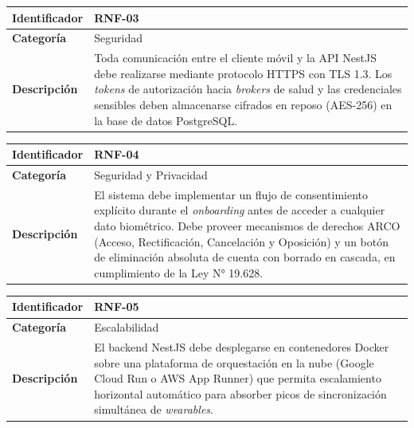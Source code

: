 \documentclass[12pt]{article}
\begin{document}
\begin{table}[h!]
    \centering
    \renewcommand{\arraystretch}{1.3}
    \begin{tabular}{|p{3.5cm}|p{11.5cm}|}
        \hline
        \rowcolor[HTML]{EFEFEF}
        \textbf{Identificador} & \textbf{RNF-03} \\ \hline
        \textbf{Categoría} & Seguridad \\ \hline
        \textbf{Descripción} & Toda comunicación entre el cliente móvil y la API NestJS debe realizarse mediante protocolo HTTPS con TLS 1.3. Los \textit{tokens} de autorización hacia \textit{brokers} de salud y las credenciales sensibles deben almacenarse cifrados en reposo (AES-256) en la base de datos PostgreSQL. \\ \hline
    \end{tabular}
\end{table}

\begin{table}[h!]
    \centering
    \renewcommand{\arraystretch}{1.3}
    \begin{tabular}{|p{3.5cm}|p{11.5cm}|}
        \hline
        \rowcolor[HTML]{EFEFEF}
        \textbf{Identificador} & \textbf{RNF-04} \\ \hline
        \textbf{Categoría} & Seguridad y Privacidad \\ \hline
        \textbf{Descripción} & El sistema debe implementar un flujo de consentimiento explícito durante el \textit{onboarding} antes de acceder a cualquier dato biométrico. Debe proveer mecanismos de derechos ARCO (Acceso, Rectificación, Cancelación y Oposición) y un botón de eliminación absoluta de cuenta con borrado en cascada, en cumplimiento de la Ley N° 19.628. \\ \hline
    \end{tabular}
\end{table}
\newpage
\begin{table}[h!]
    \centering
    \renewcommand{\arraystretch}{1.3}
    \begin{tabular}{|p{3.5cm}|p{11.5cm}|}
        \hline
        \rowcolor[HTML]{EFEFEF}
        \textbf{Identificador} & \textbf{RNF-05} \\ \hline
        \textbf{Categoría} & Escalabilidad \\ \hline
        \textbf{Descripción} & El backend NestJS debe desplegarse en contenedores Docker sobre una plataforma de orquestación en la nube (Google Cloud Run o AWS App Runner) que permita escalamiento horizontal automático para absorber picos de sincronización simultánea de \textit{wearables}. \\ \hline
    \end{tabular}
\end{table}
\end{document}
